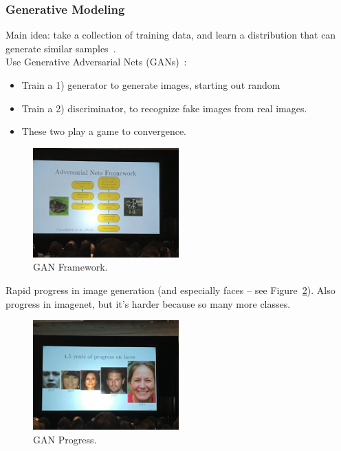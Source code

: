 \subsubsection{Generative Modeling}

Main idea: take a collection of training data, and learn a distribution that can generate similar samples~\cite{karras2017progressive}. \\

Use Generative Adversarial Nets (GANs)~\cite{goodfellow2014generative}:
\begin{itemize}
    \item Train a 1) generator to generate images, starting out random
    \item Train a 2) discriminator, to recognize fake images from real images.
    \item These two play a game to convergence.
\end{itemize}

\begin{figure}[h!]
    \centering
    \includegraphics[width=0.5\textwidth]{images/gans.JPG}
    \caption{GAN Framework.}
    \label{fig:gan}
\end{figure}

Rapid progress in image generation (and especially faces -- see Figure~\ref{fig:gan_prog}). Also progress in imagenet, but it's harder because so many more classes. \\


\begin{figure}[h!]
    \centering
    \includegraphics[width=0.5\textwidth]{images/gan_progress.JPG}
    \caption{GAN Progress.}
    \label{fig:gan_prog}
\end{figure}


